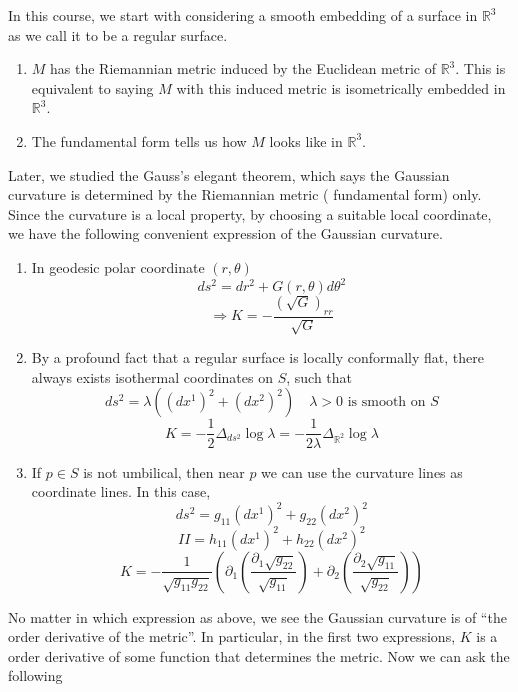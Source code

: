 In this course, we start with considering a smooth embedding of a surface
in \(\mathbb{R}^3\) as we call it to be a regular surface.
\begin{enumerate}[(1)]
    \item \(M\) has the Riemannian metric induced by the Euclidean metric
    of \(\mathbb{R}^3\). This is equivalent to saying \(M\) with this induced
    metric is isometrically embedded in \(\mathbb{R}^3\).
    \item The  fundamental form tells us how \(M\) looks
    like in \(\mathbb{R}^3\).
\end{enumerate}

Later, we studied the Gauss's elegant theorem, which says the Gaussian
curvature is determined by the Riemannian metric (
fundamental form) only. Since the curvature is a local property,
by choosing a suitable local coordinate, we have the following convenient
expression of the Gaussian curvature. 
\begin{enumerate}[(1)]
    \item In geodesic polar coordinate \((r,\theta)\)
    \[
        ds^2=dr^2+G(r,\theta)d\theta^2    
    \]
    \[
        \Rightarrow K=-\frac{(\sqrt{G})_{rr}}{\sqrt{G}}    
    \]
    \item By a profound fact that a regular surface is locally conformally
    flat, there always exists isothermal coordinates on \(S\), such that 
    \[
        ds^2=\lambda((dx^1)^2+(dx^2)^2)\quad \lambda>0 \text{ is smooth on }
        S    
    \]
    \[
      K=-\frac{1}{2}\Delta_{ds^2}\log \lambda=
      -\frac{1}{2\lambda}  \Delta_{\mathbb{R}^2}\log \lambda
    \]
    \item If \(p\in S\) is not umbilical, then near \(p\) we can use 
    the curvature lines as coordinate lines. In this case,
    \[
        ds^2=g_{11}(dx^1)^2+g_{22}(dx^2)^2    
    \]
    \[
        II=h_{11}(dx^1)^2+h_{22}(dx^2)^2    
    \]
    \[
        K=-\frac{1}{\sqrt{g_{11}g_{22}}}
        \left(
            \partial_1\left(
                \frac{\partial_1 \sqrt{g_{22}}}{\sqrt{g_{11}}}
        \right)
        +
            \partial_2\left(
                \frac{\partial_2 \sqrt{g_{11}}}{\sqrt{g_{22}}}
        \right) 
        \right) 
    \]
\end{enumerate}
No matter in which expression as above, we see the Gaussian curvature is
of ``the  order derivative of the metric''. In particular,
in the first two expressions, \(K\) is a  order derivative
of some function that determines the metric. Now we can ask the following
